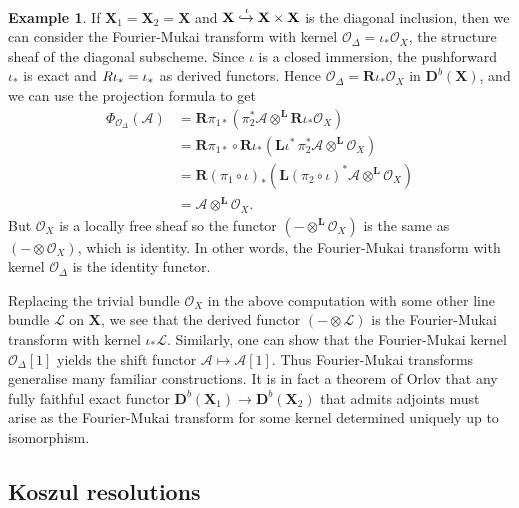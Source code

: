 \documentclass[a4paper]{article}
\theoremstyle{definition}
\newtheorem{example}[defn]{Example}
\theoremstyle{remark}
\newcommand{\deri}{\mathbf{D}}
\newcommand{\deritensor}{\ensuremath{\otimes^\mathbf{L}}}
\begin{document}
\begin{example}
    If \(\mathbf{X}_1 = \mathbf{X}_2 = \mathbf{X}\) and
    \(\mathbf{X}\xhookrightarrow{\iota} \mathbf{X}\times \mathbf{X}\) is the
    diagonal inclusion, then we can consider the Fourier-Mukai transform with
    kernel \(\mathscr{O}_\Delta = \iota_\ast \mathscr{O}_X\), the structure
    sheaf of the diagonal subscheme. Since \(\iota\) is a closed immersion, the
    pushforward \(\iota_\ast\) is exact and \(\mathscr\mathbf{R}\iota_\ast =
    \iota_\ast\) as derived functors. Hence \(\mathscr{O}_\Delta =
    \mathbf{R}\iota_\ast \mathscr{O}_X\) in \(\deri^b(\mathbf{X})\), and we can
    use the projection formula to get
    \begin{align*}
        \Phi_{\mathscr{O}_\Delta}(\mathscr{A}) 
        &= \mathbf{R}\pi_{1\ast}(\pi_2^\ast \mathscr{A}\deritensor
        \mathbf{R}\iota_\ast \mathscr{O}_X) \\ 
        &= \mathbf{R}\pi_{1\ast} \circ \mathbf{R}\iota_\ast
        (\mathbf{L}\iota^\ast\,\pi_2^\ast \mathscr{A}\deritensor
        \mathscr{O}_X)  \\
        &= \mathbf{R}(\pi_1 \circ \iota)_\ast (\mathbf{L}(\pi_2\circ \iota)^\ast
        \mathscr{A} \deritensor \mathscr{O}_X)\\
        &= \mathscr{A}\deritensor \mathscr{O}_X.
    \end{align*}
    But \(\mathscr{O}_X\) is a locally free sheaf so the functor \((-\deritensor
    \mathscr{O}_X)\) is the same as \((-\otimes\mathscr{O}_X)\), which is
    identity.  In other words, the Fourier-Mukai transform with kernel
    \(\mathscr{O}_\Delta\) is the identity functor. 

    Replacing the trivial bundle \(\mathscr{O}_X\) in the above computation
    with some other line bundle \(\mathscr{L}\) on \(\mathbf{X}\), we see that
    the derived functor \((- \otimes \mathscr{L})\) is the Fourier-Mukai
    transform with kernel \(\iota_\ast \mathscr{L}\). Similarly, one can show
    that the Fourier-Mukai kernel \(\mathscr{O}_\Delta[1]\) yields the shift
    functor \(\mathscr{A}\mapsto \mathscr{A}[1]\). Thus Fourier-Mukai transforms
    generalise many familiar constructions. It is in fact a theorem of Orlov
    that any fully faithful exact functor \(\deri^b(\mathbf{X}_1)\rightarrow
    \deri^b(\mathbf{X}_2)\) that admits adjoints must arise as the Fourier-Mukai
    transform for some kernel determined uniquely up to isomorphism. 
\end{example}

\subsection{Koszul resolutions}
\end{document}
